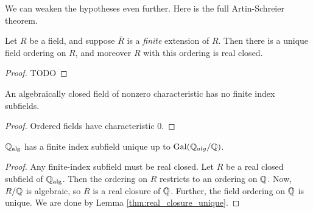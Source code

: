 We can weaken the hypotheses even further. Here is the full Artin-Schreier theorem.

\begin{theorem}
  \label{thm:Artin-Schreier}
  Let $R$ be a field, and suppose $\bar{R}$ is a \textit{finite} extension of $R$. Then there is a unique field ordering on $R$, and moreover $R$ with this ordering is real closed.
\end{theorem}
\begin{proof}
  TODO
\end{proof}

\begin{corollary}
  An algebraically closed field of nonzero characteristic has no finite index subfields.
\end{corollary}
\begin{proof}
  Ordered fields have characteristic 0.
\end{proof}

\begin{corollary}
  $\mathbb{Q}_\text{alg}$ has a finite index subfield unique up to $\operatorname{Gal}(\mathbb{Q}_{alg}/\mathbb{Q})$.
\end{corollary}
\begin{proof}
  Any finite-index subfield must be real closed. Let $R$ be a real closed subfield of $\mathbb{Q}_\text{alg}$. Then the ordering on $R$ restricts to an ordering on $\mathbb{Q}$. Now, $R/\mathbb{Q}$ is algebraic, so $R$ is a real closure of $\mathbb{Q}$. Further, the field ordering on $\mathbb{Q}$ is unique. We are done by Lemma \ref{thm:real_closure_unique}.
\end{proof}